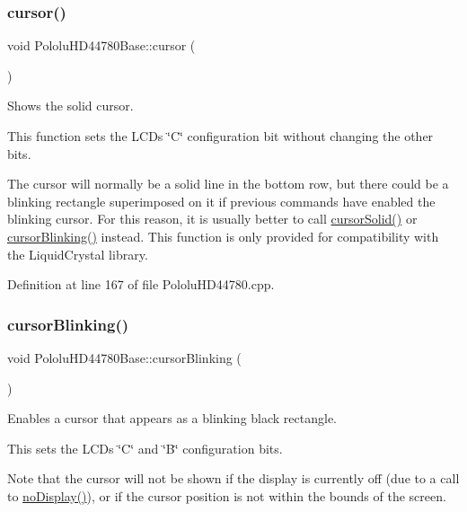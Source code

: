 \subsubsection{\texorpdfstring{cursor()}{cursor()}}
{\footnotesize\ttfamily void Pololu\+H\+D44780\+Base\+::cursor (\begin{DoxyParamCaption}{ }\end{DoxyParamCaption})\hspace{0.3cm}{\ttfamily [inherited]}}

Shows the solid cursor.

This function sets the L\+CD\textquotesingle{}s \char`\"{}\+C\char`\"{} configuration bit without changing the other bits.

The cursor will normally be a solid line in the bottom row, but there could be a blinking rectangle superimposed on it if previous commands have enabled the blinking cursor. For this reason, it is usually better to call \hyperlink{class_pololu_h_d44780_base_a6a4d8e79beda9f7c81659a8e13c8c338}{cursor\+Solid()} or \hyperlink{class_pololu_h_d44780_base_a6a53a6cffbb77953b5a2c4ae49e288de}{cursor\+Blinking()} instead. This function is only provided for compatibility with the Liquid\+Crystal library. 

Definition at line 167 of file Pololu\+H\+D44780.\+cpp.

\mbox{\label{class_pololu_h_d44780_base_a6a53a6cffbb77953b5a2c4ae49e288de}} 
\subsubsection{\texorpdfstring{cursor\+Blinking()}{cursorBlinking()}}
{\footnotesize\ttfamily void Pololu\+H\+D44780\+Base\+::cursor\+Blinking (\begin{DoxyParamCaption}{ }\end{DoxyParamCaption})\hspace{0.3cm}{\ttfamily [inherited]}}

Enables a cursor that appears as a blinking black rectangle.

This sets the L\+CD\textquotesingle{}s \char`\"{}\+C\char`\"{} and \char`\"{}\+B\char`\"{} configuration bits.

Note that the cursor will not be shown if the display is currently off (due to a call to \hyperlink{class_pololu_h_d44780_base_abc2d4e126017565c2a0cf2aac67870a0}{no\+Display()}), or if the cursor position is not within the bounds of the screen. 


